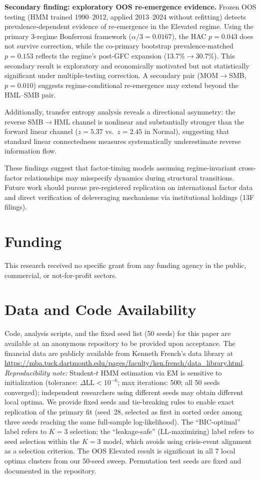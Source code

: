 \documentclass[sigconf,anonymous]{acmart}
\begin{document}
\textbf{Secondary finding: exploratory OOS re-emergence evidence.}
Frozen OOS testing (HMM trained 1990--2012, applied 2013--2024 without refitting)
detects prevalence-dependent evidence of re-emergence in the Elevated regime.
Using the primary 3-regime Bonferroni framework ($\alpha/3 = 0.0167$), the HAC $p = 0.043$
does not survive correction, while the co-primary bootstrap prevalence-matched
$p = 0.153$ reflects the regime's post-GFC expansion (13.7\%$\to$30.7\%).
This secondary result is exploratory and economically motivated but not statistically
significant under multiple-testing correction. A secondary pair (MOM$\to$SMB, $p = 0.010$)
suggests regime-conditional re-emergence may extend beyond the HML--SMB pair.

Additionally, transfer entropy analysis reveals a directional asymmetry: the reverse SMB$\to$HML channel is nonlinear and substantially stronger than the forward linear channel ($z = 5.37$ vs.\ $z = 2.45$ in Normal), suggesting that standard linear connectedness measures systematically underestimate reverse information flow.

These findings suggest that factor-timing models assuming regime-invariant cross-factor
relationships may misspecify dynamics during structural transitions. Future work should
pursue pre-registered replication on international factor data and direct verification
of deleveraging mechanisms via institutional holdings (13F filings).

\section*{Funding}

This research received no specific grant from any funding agency in the public,
commercial, or not-for-profit sectors.

\section*{Data and Code Availability}

Code, analysis scripts, and the fixed seed list (50 seeds) for this paper are available at an anonymous repository to be provided upon acceptance. The financial data are publicly available from Kenneth French's data library at \url{https://mba.tuck.dartmouth.edu/pages/faculty/ken.french/data_library.html}. \emph{Reproducibility note:} Student-$t$ HMM estimation via EM is sensitive to initialization (tolerance: $\Delta\text{LL} < 10^{-6}$; max iterations: 500; all 50 seeds converged); independent researchers using different seeds may obtain different local optima. We provide fixed seeds and tie-breaking rules to enable exact replication of the primary fit (seed~28, selected as first in sorted order among three seeds reaching the same full-sample log-likelihood). The ``BIC-optimal'' label refers to $K = 3$ selection; the ``leakage-safe'' (LL-maximizing) label refers to seed selection within the $K = 3$ model, which avoids using crisis-event alignment as a selection criterion. The OOS Elevated result is significant in all 7 local optima clusters from our 50-seed sweep. Permutation test seeds are fixed and documented in the repository.
\end{document}
